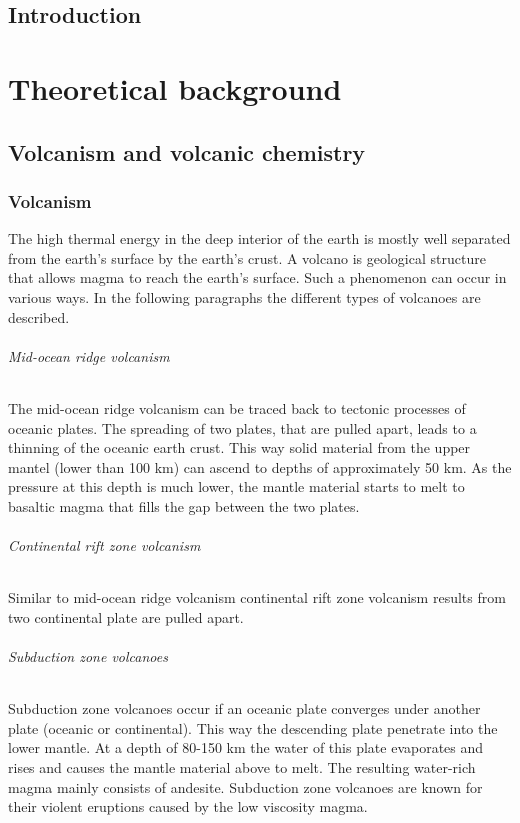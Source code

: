 \documentclass  [
  paper    = a4,
  BCOR     = 10mm,
  twoside,
  fontsize = 12pt,
  fleqn,
  toc      = bibnumbered,
  toc      = listofnumbered,
  numbers  = noendperiod,
  headings = normal,
  listof   = leveldown,
  version  = 3.03
]                                       {scrreprt}
\begin{document}
  

  \tableofcontents
	\chapter{Introduction}	
	
    \part{Theoretical background}
\chapter{Volcanism and volcanic chemistry}

\section{Volcanism}
The high thermal energy in the deep interior of the earth is mostly well separated from the earth’s surface by the earth’s crust. A volcano is geological structure that allows magma to reach the earth’s surface. Such a phenomenon can occur in various ways. In the following paragraphs the different types of volcanoes are described.
\paragraph{ Mid-ocean ridge volcanism}
The mid-ocean ridge volcanism can be traced back to tectonic processes of oceanic plates. The spreading of two plates, that are pulled apart, leads to a thinning of the oceanic earth crust. This way solid material from the upper mantel (lower than 100 km) can ascend to depths of approximately 50 km. As the pressure at this depth is much lower, the mantle material starts to melt to basaltic magma that fills the gap between the two plates.
\paragraph{ Continental rift zone volcanism}
Similar to mid-ocean ridge volcanism continental rift zone volcanism results from two continental plate are pulled apart.
\paragraph{ Subduction zone volcanoes}
Subduction zone volcanoes occur if an oceanic plate converges under another plate (oceanic or continental). This way the descending plate penetrate into the lower mantle. At a depth of 80-150 km the water of this plate evaporates and rises and causes the mantle material above to melt. The resulting water-rich magma mainly consists of andesite. Subduction zone volcanoes are known for their violent eruptions caused by the low viscosity magma.
\end{document}
